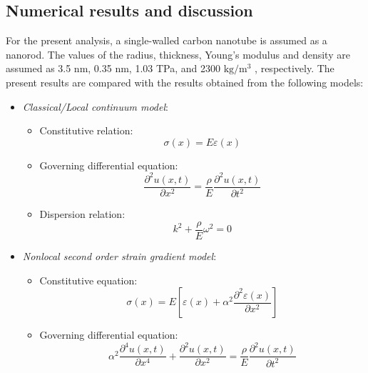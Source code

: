 \subsection*{Numerical results and discussion}
For the present analysis, a single-walled carbon nanotube is
assumed as a nanorod. The values of the radius, thickness, Young’s
modulus and density are assumed as 3.5 nm, 0.35 nm, 1.03 TPa,
and 2300 $\mathrm{kg/m^3}$ , respectively.
The present results are compared with the results obtained from
the following models:\\
\begin{itemize}
\item \textit{Classical/Local continuum model}:
	\begin{itemize}
	\item Constitutive relation:\\
		\begin{equation}
		\sigma(x) = E \varepsilon(x)
		\end{equation}
	\item Governing differential equation:\\
		\begin{equation}
			\dfrac{\partial^2 u(x,t)}{\partial x^2} = \dfrac{\rho}{E} 					\dfrac{\partial^2 u(x,t)}{\partial t^2}
		\end{equation}
	\item Dispersion relation:\\
		\begin{equation}
			k^2 + \dfrac{\rho}{E} \omega^2 = 0
		\end{equation}
	\end{itemize}
\item \textit{Nonlocal second order strain gradient model}:\\
	\begin{itemize}
	\item Constitutive equation:\\
	\begin{equation}
		\sigma(x) = E \left[ \varepsilon(x) + \alpha^2 \dfrac{\partial^2 \varepsilon(x)}		{\partial x^2} \right]
	\end{equation}
	\item Governing differential equation:\\
	\begin{equation}
	\alpha^2 \dfrac{\partial^4 u(x,t)}{\partial x^4} + \dfrac{\partial^2 u(x,t)}{\partial x^2} = \dfrac{\rho}{E} \dfrac{\partial^2 u(x,t)}{\partial t^2}
	\end{equation}

\end{itemize}
\end{itemize}
